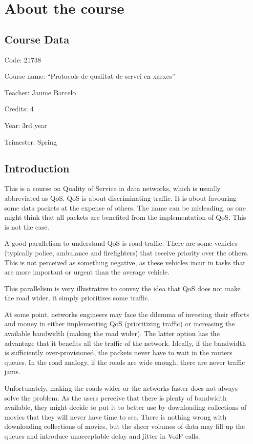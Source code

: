 \chapter{About the course}

\section{Course Data}

Code: 21738

Course name: ``Protocols de qualitat de servei en xarxes''

Teacher: Jaume Barcelo

Credits: 4

Year: 3rd year

Trimester: Spring

\section{Introduction}
This is a course on Quality of Service in data networks, which is usually abbreviated as QoS.
QoS is about discriminating traffic.
It is about favouring some data packets at the expense of others.
The name can be misleading, as one might think that all packets are benefited from the implementation of QoS.
This is not the case.

A good parallelism to understand QoS is road traffic.
There are some vehicles (typically police, ambulance and firefighters) that receive priority over the others. 
This is not perceived as something negative, as these vehicles incur in tasks that are more important or urgent than the average vehicle.

This parallelism is very illustrative to convey the idea that QoS does not make the road wider, it simply prioritizes some traffic.

At some point, networks engineers may face the dilemma of investing their efforts and money in either implementing QoS (prioritizing traffic) or increasing the available bandwidth (making the road wider).
The latter option has the advantage that it benefits all the traffic of the network.
Ideally, if the bandwidth is sufficiently over-provisioned, the packets never have to wait in the routers queues.
In the road analogy, if the roads are wide enough, there are never traffic jams.

Unfortunately, making the roads wider or the networks faster does not always solve the problem.
As the users perceive that there is plenty of bandwidth available, they might decide to put it to better use by downloading collections of movies that they will never have time to see.
There is nothing wrong with downloading collections of movies, but the sheer volumes of data may fill up the queues and introduce unacceptable delay and jitter in VoIP calls.

